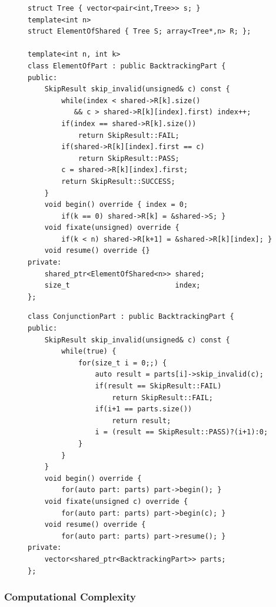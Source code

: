 \begin{figure}[p]
\begin{lstlisting}[language=MyCpp,basicstyle=\linespread{0.90}\ttfamily]
struct Tree { vector<pair<int,Tree>> s; }
template<int n>
struct ElementOfShared { Tree S; array<Tree*,n> R; };

template<int n, int k>
class ElementOfPart : public BacktrackingPart {
public:
    SkipResult skip_invalid(unsigned& c) const {
        while(index < shared->R[k].size()
           && c > shared->R[k][index].first) index++;
        if(index == shared->R[k].size())
            return SkipResult::FAIL;
        if(shared->R[k][index].first == c)
            return SkipResult::PASS;
        c = shared->R[k][index].first;
        return SkipResult::SUCCESS;
    }
    void begin() override { index = 0;
        if(k == 0) shared->R[k] = &shared->S; }
    void fixate(unsigned) override {
        if(k < n) shared->R[k+1] = &shared->R[k][index]; }
    void resume() override {}
private:
    shared_ptr<ElementOfShared<n>> shared;
    size_t                         index;
};
\end{lstlisting}
\begin{lstlisting}[language=MyCpp,basicstyle=\linespread{0.90}\ttfamily,
                   label={partimplementations},caption=
   {{\tt BacktrackingPart} is implemented for element-of constraints and
    conjunction constraints.
    The struct {\tt ElementOfShared} corresponds to
    $\protect{(R_k[E_S](M,x))_{k=1\dots n}}$ in \Cref{theo:theo1}.}]
class ConjunctionPart : public BacktrackingPart {
public:
    SkipResult skip_invalid(unsigned& c) const {
        while(true) {
            for(size_t i = 0;;) {
                auto result = parts[i]->skip_invalid(c);
                if(result == SkipResult::FAIL)
                    return SkipResult::FAIL;
                if(i+1 == parts.size())
                    return result;
                i = (result == SkipResult::PASS)?(i+1):0;
            }
        }
    }
    void begin() override {
        for(auto part: parts) part->begin(); }
    void fixate(unsigned c) override {
        for(auto part: parts) part->begin(c); }
    void resume() override {
        for(auto part: parts) part->resume(); }
private:
    vector<shared_ptr<BacktrackingPart>> parts;
};
\end{lstlisting}
\end{figure}

\subsubsection{Computational Complexity}


